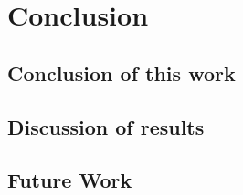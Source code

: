 \chapter{Conclusion}
\label{chapter:Conclusion}

\section{Conclusion of this work}

\section{Discussion of results}

\section{Future Work}


